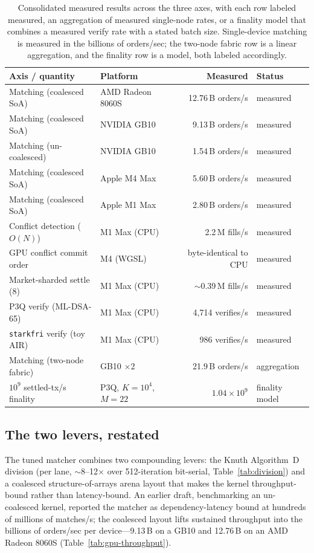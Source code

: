 \begin{table}[H]
\centering
\renewcommand{\arraystretch}{1.3}
\begin{tabular}{p{4.4cm} l r l}
\toprule
\textbf{Axis / quantity} & \textbf{Platform} & \textbf{Measured} & \textbf{Status} \\
\midrule
Matching (coalesced SoA) & AMD Radeon 8060S & 12.76\,B orders/s & measured \\
Matching (coalesced SoA) & NVIDIA GB10 & 9.13\,B orders/s & measured \\
Matching (un-coalesced)   & NVIDIA GB10 & 1.54\,B orders/s & measured \\
Matching (coalesced SoA) & Apple M4 Max & 5.60\,B orders/s & measured \\
Matching (coalesced SoA) & Apple M1 Max & 2.80\,B orders/s & measured \\
Conflict detection ($O(N)$) & M1 Max (CPU) & 2.2\,M fills/s & measured \\
GPU conflict commit order & M4 (WGSL) & byte-identical to CPU & measured \\
Market-sharded settle (8) & M1 Max (CPU) & $\sim$0.39\,M fills/s & measured \\
P3Q verify (ML-DSA-65) & M1 Max (CPU) & 4{,}714 verifies/s & measured \\
\texttt{starkfri} verify (toy AIR) & M1 Max (CPU) & 986 verifies/s & measured \\
\midrule
Matching (two-node fabric) & GB10 $\times$2 & 21.9\,B orders/s & aggregation \\
$10^{9}$ settled-tx/s finality & P3Q, $K{=}10^{4}$, $M{=}22$ & $1.04\times10^{9}$ & finality model \\
\bottomrule
\end{tabular}
\caption{Consolidated measured results across the three axes, with each row labeled
measured, an aggregation of measured single-node rates, or a finality model that combines a
measured verify rate with a stated batch size. Single-device matching is measured in the
billions of orders/sec; the two-node fabric row is a linear aggregation, and the finality
row is a model, both labeled accordingly.}
\label{tab:consolidated}
\end{table}

\subsection{The two levers, restated}

The tuned matcher combines two compounding levers: the Knuth Algorithm~D division (per lane,
$\sim$8--12$\times$ over 512-iteration bit-serial, Table~\ref{tab:division}) and a coalesced
structure-of-arrays arena layout that makes the kernel throughput-bound rather than
latency-bound. An earlier draft, benchmarking an un-coalesced kernel, reported the matcher as
dependency-latency bound at hundreds of millions of matches/s; the coalesced layout lifts
sustained throughput into the billions of orders/sec per device---9.13\,B on a GB10 and
12.76\,B on an AMD Radeon 8060S (Table~\ref{tab:gpu-throughput}).

